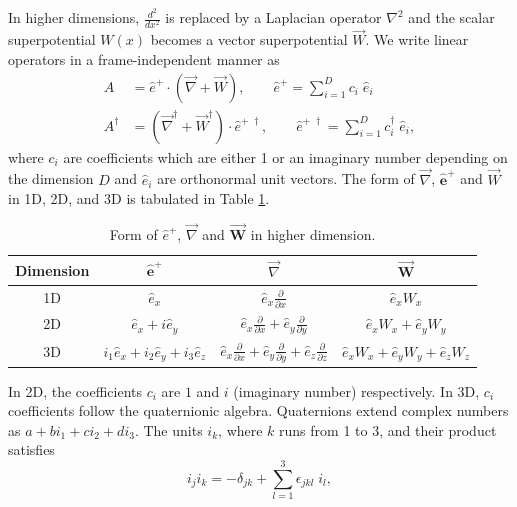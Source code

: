 \documentclass[12pt]{article}
\numberwithin{equation}{section} %
\begin{document}
In higher dimensions, $\frac{d^2}{dx^2}$ is replaced by a Laplacian operator \(\nabla^2 \) and the scalar superpotential $W(x)$ becomes a vector superpotential \( \vec{W} \). We write linear operators in a frame-independent manner \cite{fernandez2004higher, das1997higher} as
\begin{align}\label{F:A-}
A &= \hat{e}^+ \cdot \left(\vec{\nabla} + \vec{W}\right),\qquad  \hat{e}^+=\sum_{i=1}^{D}c_i\;\hat{e}_i\\ \label{F:A+}
A^{\dagger} &= \left(\vec{\nabla}^{\dagger} + \vec{W}^{\dagger}\right)\cdot \hat{e}^{+\;\dagger},\qquad  \hat{e}^{+\;\dagger}=\sum_{i=1}^{D}c_i^{\dagger}\;\hat{e}_i ,
\end{align} 
where \(c_i\) are coefficients which are either 1 or an imaginary number depending on the dimension \(D\) and \( \hat{e}_i \) are orthonormal unit vectors. The form of \(\vec{\nabla}\), \(\mathbf{\hat{e}^+}\) and \(\vec{W}\) in 1D, 2D, and 3D is tabulated in Table \ref{2D-3D}.
\begin{table}[h]
    \centering
    \begin{tabular}{|c|c|c|c|}
    \hline
    \textbf{Dimension}&$\mathbf{\hat{e}^+}$ & $\vec{\nabla}$ & $\mathbf{\vec{W}}$ \\
        \hline
        1D &\( \hat{e}_x \) &\( \hat{e}_x\frac{\partial}{\partial x} \) & \(  \hat{e}_x W_x \) \\
        2D &\( \hat{e}_x + i\hat{e}_y \) &\( \hat{e}_x\frac{\partial}{\partial x} + \hat{e}_y \frac{\partial}{\partial y}\) & \( \hat{e}_x W_x + \hat{e}_y W_y \) \\
        3D &\( i_1\hat{e}_x + i_2\hat{e}_y + i_3\hat{e}_z \) &\(\hat{e}_x\frac{\partial}{\partial x} + \hat{e}_y \frac{\partial}{\partial y}+\hat{e}_z \frac{\partial}{\partial z}\) & \( \hat{e}_x W_x + \hat{e}_y W_y + \hat{e}_z W_z \) \\
        \hline
    \end{tabular}
    \caption{Form of $\hat{e}^+$, $\vec{\nabla}$ and $\mathbf{\vec{W}}$ in higher dimension.}
    \label{2D-3D}
\end{table} 
In 2D, the coefficients $c_i$ are $1$ and $i$ (imaginary number) respectively. In 3D, $c_i$ coefficients follow the quaternionic algebra. Quaternions extend complex numbers as $a+bi_1+ci_2+di_3$. The units $i_k$, where $k$ runs from 1 to 3, and their product satisfies \cite{das1997higher} 
\begin{equation}\label{F:quat-algebra}
    i_j i_k = -\delta_{jk} + \sum_{l=1}^{3}\epsilon_{jkl}\;i_l,
\end{equation}
\end{document}
